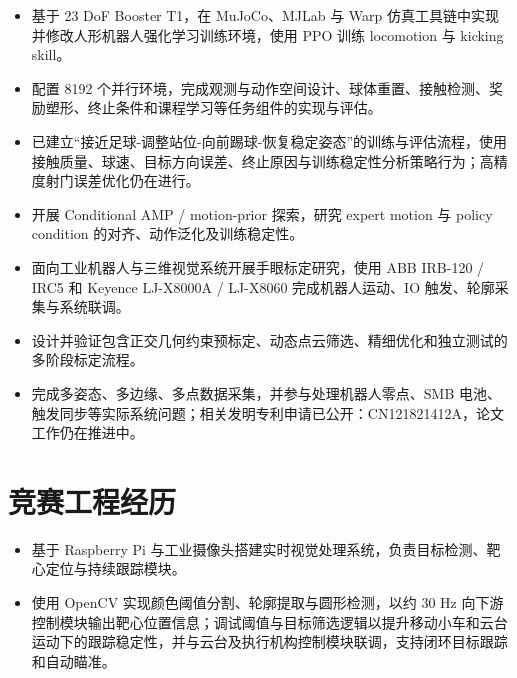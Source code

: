 \documentclass[10pt]{article}
\begin{document}
\begin{itemize}
  \item 基于 23 DoF Booster T1，在 MuJoCo、MJLab 与 Warp 仿真工具链中实现并修改人形机器人强化学习训练环境，使用 PPO 训练 locomotion 与 kicking skill。
  \item 配置 8192 个并行环境，完成观测与动作空间设计、球体重置、接触检测、奖励塑形、终止条件和课程学习等任务组件的实现与评估。
  \item 已建立“接近足球-调整站位-向前踢球-恢复稳定姿态”的训练与评估流程，使用接触质量、球速、目标方向误差、终止原因与训练稳定性分析策略行为；高精度射门误差优化仍在进行。
  \item 开展 Conditional AMP / motion-prior 探索，研究 expert motion 与 policy condition 的对齐、动作泛化及训练稳定性。
\end{itemize}

\begin{itemize}
  \item 面向工业机器人与三维视觉系统开展手眼标定研究，使用 ABB IRB-120 / IRC5 和 Keyence LJ-X8000A / LJ-X8060 完成机器人运动、IO 触发、轮廓采集与系统联调。
  \item 设计并验证包含正交几何约束预标定、动态点云筛选、精细优化和独立测试的多阶段标定流程。
  \item 完成多姿态、多边缘、多点数据采集，并参与处理机器人零点、SMB 电池、触发同步等实际系统问题；相关发明专利申请已公开：CN121821412A，论文工作仍在推进中。
\end{itemize}

\section{竞赛工程经历}\color{black}
\begin{itemize}
  \item 基于 Raspberry Pi 与工业摄像头搭建实时视觉处理系统，负责目标检测、靶心定位与持续跟踪模块。
  \item 使用 OpenCV 实现颜色阈值分割、轮廓提取与圆形检测，以约 30 Hz 向下游控制模块输出靶心位置信息；调试阈值与目标筛选逻辑以提升移动小车和云台运动下的跟踪稳定性，并与云台及执行机构控制模块联调，支持闭环目标跟踪和自动瞄准。
\end{itemize}
\end{document}
